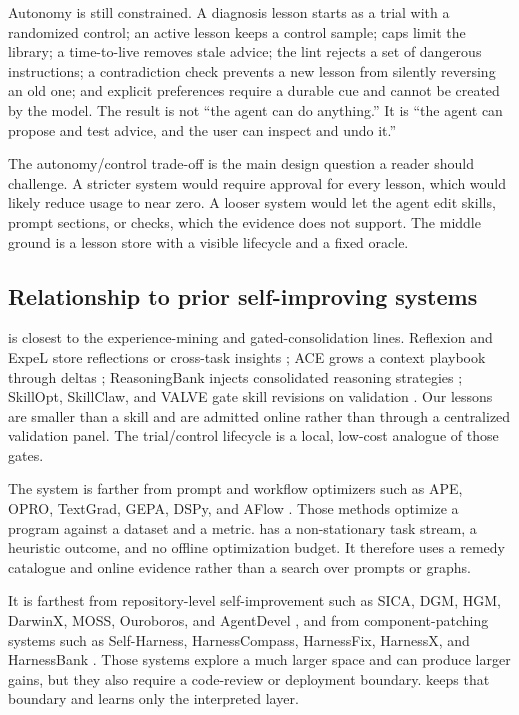 Autonomy is still constrained. A diagnosis lesson starts as a trial with a randomized control; an active lesson keeps a control sample; caps limit the library; a time-to-live removes stale advice; the lint rejects a set of dangerous instructions; a contradiction check prevents a new lesson from silently reversing an old one; and explicit preferences require a durable cue and cannot be created by the model. The result is not ``the agent can do anything.'' It is ``the agent can propose and test advice, and the user can inspect and undo it.''

The autonomy/control trade-off is the main design question a reader should challenge. A stricter system would require approval for every lesson, which would likely reduce usage to near zero. A looser system would let the agent edit skills, prompt sections, or checks, which the evidence does not support. The middle ground is a lesson store with a visible lifecycle and a fixed oracle.

\subsection{Relationship to prior self-improving systems}
\system{} is closest to the experience-mining and gated-consolidation lines. Reflexion and ExpeL store reflections or cross-task insights \citep{shinn2023reflexion,zhao2024expel}; ACE grows a context playbook through deltas \citep{zhang2026agentic}; ReasoningBank injects consolidated reasoning strategies \citep{ouyang2026reasoningbank}; SkillOpt, SkillClaw, and VALVE gate skill revisions on validation \citep{yang2026skillopt,ma2026skillclaw,wang2026valve}. Our lessons are smaller than a skill and are admitted online rather than through a centralized validation panel. The trial/control lifecycle is a local, low-cost analogue of those gates.

The system is farther from prompt and workflow optimizers such as APE, OPRO, TextGrad, GEPA, DSPy, and AFlow \citep{zhou2023large,yang2024large,yuksekgonul2025textgrad,agrawal2026gepa,khattab2024dspy,zhang2025aflow}. Those methods optimize a program against a dataset and a metric. \system{} has a non-stationary task stream, a heuristic outcome, and no offline optimization budget. It therefore uses a remedy catalogue and online evidence rather than a search over prompts or graphs.

It is farthest from repository-level self-improvement such as SICA, DGM, HGM, DarwinX, MOSS, Ouroboros, and AgentDevel \citep{robeyns2025selfimproving,zhang2026darwin,wang2025huxley,zhang2026darwinx,cai2026moss,razzhigaev2026ouroboros,zhang2026agentdevel}, and from component-patching systems such as Self-Harness, HarnessCompass, HarnessFix, HarnessX, and HarnessBank \citep{zhang2026selfharness,zhang2026harnesscompass,chen2026harnessfix,chen2026harnessx,luo2026harnessbank}. Those systems explore a much larger space and can produce larger gains, but they also require a code-review or deployment boundary. \system{} keeps that boundary and learns only the interpreted layer.

